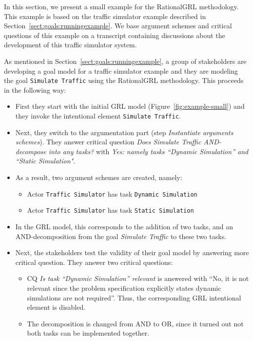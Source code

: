 In this section, we present a small example for the RationalGRL methodology. This example is based on the traffic simulator example described in Section~\ref{sect:goals:runningexample}. We base argument schemes and critical questions of this example on a transcript containing discussions about the development of this traffic simulator system. %

As mentioned in Section~\ref{sect:goals:runningexample}, a group of stakeholders are developing a goal model for a traffic simulator example and they are modeling the goal \texttt{Simulate Traffic} using the RationalGRL methodology. This proceeds in the following way:
\begin{itemize}
\item
First they start %
with the initial GRL model (Figure~\ref{fig:example-small}) and they invoke the intentional element \texttt{Simulate Traffic}. 
\item Next, they switch to the argumentation part (step \emph{Instantiate arguments schemes}). They answer critical question \emph{Does Simulate Traffic AND-decompose into any tasks?} with \emph{Yes: namely tasks ``Dynamic Simulation'' and ``Static Simulation"}.
\item As a result, two argument schemes are created, namely:
\begin{itemize}
\item Actor \texttt{Traffic Simulator} has task \texttt{Dynamic Simulation}
\item Actor \texttt{Traffic Simulator} has task \texttt{Static Simulation}
\end{itemize}
\item In the GRL model, this corresponds to the addition of two tasks, and an AND-decomposition from the goal \emph{Simulate Traffic} to these two tasks.
\item Next, the stakeholders test the validity of their goal model by answering more critical question. They answer two critical questions:
\begin{itemize}
\item
CQ \emph{Is task ``Dynamic Simulation'' relevant} is answered with ``No, it is not relevant since the problem specification explicitly states dynamic simulations are not required''. Thus, the corresponding GRL intentional element is disabled.
\item The decomposition is changed from AND to OR, since it turned out not both tasks can be implemented together.
\end{itemize}
\end{itemize}


